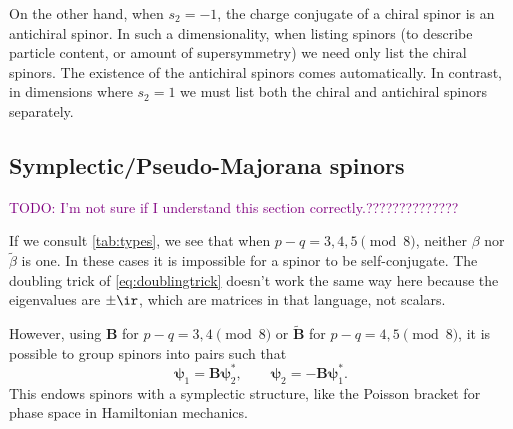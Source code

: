 \documentclass[11pt]{article}
\newcommand{\todo}[1]{\textcolor{purple}{TODO: #1}}
\newcommand{\cc}{^\ast}
\newcommand{\B}{\mathbf{B}}
\newcommand{\Bt}{\widetilde{\B}}
\newcommand{\psib}{\boldsymbol{\psi}}
\newcommand{\betat}{\tilde{\beta}}
\begin{document}
On the other hand, when \(s_2 = -1\), the charge conjugate of a chiral spinor is an antichiral spinor.
In such a dimensionality, when listing spinors (\eg to describe particle content, or amount of supersymmetry) we need only list the chiral spinors.
The existence of the antichiral spinors comes automatically.
In contrast, in dimensions where \(s_2 = 1\) we must list both the chiral and antichiral spinors separately.



\subsection{Symplectic/Pseudo-Majorana spinors}\label{sec:symplecticmajorana}

\todo{I'm not sure if I understand this section correctly.??????????????}

If we consult \cref{tab:types}, we see that when \( p-q = 3,4,5 \pmod 8 \), neither \(\beta\) nor \(\betat\) is one.
In these cases it is impossible for a spinor to be self-conjugate.
The doubling trick of \cref{eq:doublingtrick} doesn't work the same way here because the eigenvalues are \(\pm\ir\), which are matrices in that language, not scalars.

However, using \(\B\) for \( p-q = 3,4 \pmod 8 \) or \(\Bt\) for \( p-q = 4,5 \pmod 8 \), it is possible to group spinors into pairs such that
%
\begin{equation}\label{eq:pseudomajorana}
  \psib_1 = \B \psib_2\cc,
  \qquad
  \psib_2 = - \B \psib_1\cc.
\end{equation}
%
This endows spinors with a symplectic structure, like the Poisson bracket for phase space in Hamiltonian mechanics.
\end{document}
